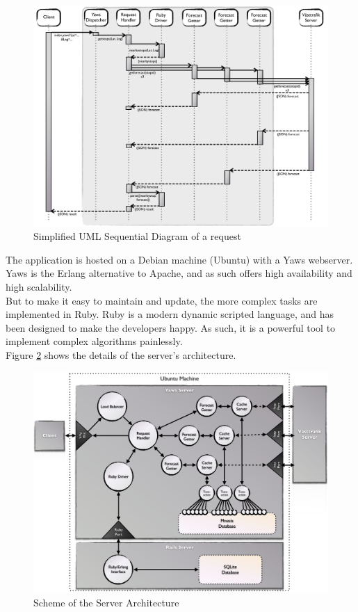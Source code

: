 \begin{figure}[ht]
\center
\includegraphics[scale=0.4]{pics/message_passing}
\caption{Simplified UML Sequential Diagram of a request}
\label{fig:message_passing}
\end{figure}

\clearpage

The application is hosted on a Debian machine (Ubuntu) with a Yaws webserver. Yaws is the Erlang alternative to Apache, and as such offers high availability and high scalability.\\

But to make it easy to maintain and update, the more complex tasks are implemented in Ruby. Ruby is a modern dynamic scripted language, and has been designed to make the developers happy. As such, it is a powerful tool to implement complex algorithms painlessly.\\

Figure \ref{fig:server_architecture} shows the details of the server's architecture.

\begin{figure}[ht]
\center
\includegraphics[scale=0.4]{pics/server_side}
\caption{Scheme of the Server Architecture}
\label{fig:server_architecture}
\end{figure}

